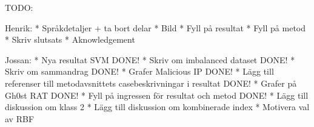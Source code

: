 TODO:

Henrik:
* Språkdetaljer + ta bort delar
* Bild
* Fyll på resultat
* Fyll på metod
* Skriv slutsats
* Aknowledgement

Jossan:
* Nya resultat SVM  DONE!
* Skriv om imbalanced dataset DONE!
* Skriv om sammandrag DONE!
* Grafer Malicious IP DONE!
* Lägg till referenser till metodavsnittets casebeskrivningar i resultat DONE!
* Grafer på Gh0st RAT DONE!
* Fyll på ingressen för resultat och metod DONE!
* Lägg till diskussion om klass 2
* Lägg till diskussion om kombinerade index
* Motivera val av RBF
